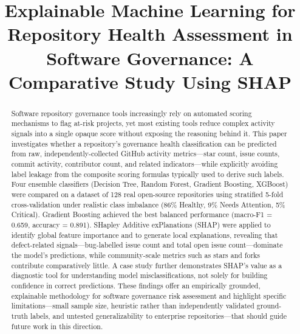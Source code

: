 \documentclass[conference]{IEEEtran}
\begin{document}
\title{Explainable Machine Learning for Repository Health Assessment in Software Governance: A Comparative Study Using SHAP}

\author{
}

\maketitle

\begin{abstract}
Software repository governance tools increasingly rely on automated scoring mechanisms to
flag at-risk projects, yet most existing tools reduce complex activity signals into a
single opaque score without exposing the reasoning behind it. This paper investigates
whether a repository's governance health classification can be predicted from raw,
independently-collected GitHub activity metrics---star count, issue counts, commit
activity, contributor count, and related indicators---while explicitly avoiding label
leakage from the composite scoring formulas typically used to derive such labels. Four
ensemble classifiers (Decision Tree, Random Forest, Gradient Boosting, XGBoost) were
compared on a dataset of 128 real open-source repositories using stratified 5-fold
cross-validation under realistic class imbalance (86\% Healthy, 9\% Needs Attention, 5\%
Critical). Gradient Boosting achieved the best balanced performance (macro-F1 = 0.659,
accuracy = 0.891). SHapley Additive exPlanations (SHAP) were applied to identify global
feature importance and to generate local explanations, revealing that defect-related
signals---bug-labelled issue count and total open issue count---dominate the model's
predictions, while community-scale metrics such as stars and forks contribute
comparatively little. A case study further demonstrates SHAP's value as a diagnostic tool
for understanding model misclassifications, not solely for building confidence in correct
predictions. These findings offer an empirically grounded, explainable methodology for
software governance risk assessment and highlight specific limitations---small sample
size, heuristic rather than independently validated ground-truth labels, and untested
generalizability to enterprise repositories---that should guide future work in this
direction.
\end{abstract}
\end{document}
